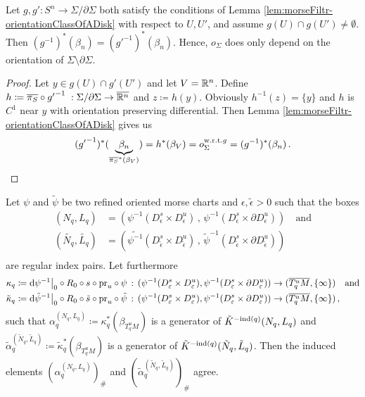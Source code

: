 \begin{corollary}
	Let $g,g':S^n \to \Sigma /\partial \Sigma$ both satisfy the conditions of Lemma \ref{lem:morseFiltr-orientationClassOfADisk} with respect to $U,U'$, and assume 
	$g(U) \cap g(U')\neq \emptyset$. Then $(g^{-1})^*(\beta_n)=({g'}^{-1})^*(\beta_n)$. Hence, $o_\Sigma$ does only depend on the orientation of $\Sigma\setminus \partial \Sigma$. 
\end{corollary}
\begin{proof}
	Let $y\in g(U)\cap g'(U')$ and let $V=\mathbb{R}^n$. Define $h \coloneq \overline{\pi_S} \circ {g'}^{-1}\;:\Sigma / \partial \Sigma\to \overline{\mathbb{R}^n}$ and $z\coloneq h(y)$. Obviously $h^{-1}(z)=\{y\}$ and $h$ is $C^1$ near $y$ with orientation preserving differential. Then Lemma \ref{lem:morseFiltr-orientationClassOfADisk} gives us 
	\begin{equation*}
		({g'}^{-1})^*(\underbrace{\beta_n}_{\overline{\pi_S}^*(\beta_V)})=h^*(\beta_V)=o_{\Sigma}^{\mathrm{w.r.t.} g}=(g^{-1})^*(\beta_n)\,.\qedhere
	\end{equation*}
\end{proof}
 \begin{remark}\label{rem:morseFiltr-canonicalGeneratorsIndependOfChartAndEpsilon}
	Let $\psi$ and $\tilde{\psi}$ be two refined oriented morse charts and $\epsilon,\tilde{\epsilon}>0$ such that the boxes
	\begin{align*}
		(N_q,L_q)&=(\psi^{-1}(D^s_\epsilon \times D^u_\epsilon)\,,\, \psi^{-1}(D^s_\epsilon \times \partial D^u_\epsilon))\quad \text{and}\\
		(\tilde{N_q},\tilde{L_q})&=(\tilde{\psi^{-1}}(D^s_{\tilde{\epsilon}} \times D^u_{\tilde{\epsilon}})\,,\, \tilde{\psi}^{-1}(D^s_{\tilde{\epsilon}} \times \partial D^u_{\tilde{\epsilon}}))\\
	\end{align*} are regular index pairs. Let furthermore 
	\begin{align*}
		\kappa_q\coloneq&  \left.\mathop{}\!\mathrm{d} \psi^{-1}\right|_{0}\circ R_0\circ s\circ \mathrm{pr}_u \circ \psi	\,:\,(\psi^{-1}( D^{s }_\varepsilon\times  D^{u }_\varepsilon),\psi^{-1}( D^{ s}_\varepsilon\times \partial D^{u}_\varepsilon))  \to (\overline{T^u_qM},\{\infty\})\quad \text{and}\\
		\tilde{\kappa}_q\coloneq & \left.\mathop{}\!\mathrm{d} \tilde{\psi}^{-1}\right|_{0}\circ R_0\circ \tilde{s}\circ \mathrm{pr}_u \circ \tilde{\psi}	\,:\,(\psi^{-1}( D^{s }_\varepsilon\times  D^{u }_\varepsilon),\psi^{-1}( D^{ s}_\varepsilon\times \partial D^{u}_\varepsilon))  \to (\overline{T^u_qM},\{\infty\})\,,
	\end{align*} such that $\alpha_q^{(N_q,L_q)}\coloneq \kappa_q^*(\beta_{T^u_qM})$ is a generator of $\tilde{K}^{-\mathrm{ind}(q)}(N_q,L_q)$ and 
	$\tilde{\alpha}_q^{(\tilde{N}_q,\tilde{L}_q)}\coloneq \tilde{\kappa}_q^*(\beta_{T^u_qM})$ is a generator of $\tilde{K}^{-\mathrm{ind}(q)}(\tilde{N}_q,\tilde{L}_q)$. Then the induced elements $(\alpha_q^{(N_q,L_q)})_{\#}$ and $(\tilde{\alpha}_q^{(\tilde{N}_q,\tilde{L}_q)})_{\#}$ agree. 
 \end{remark}
